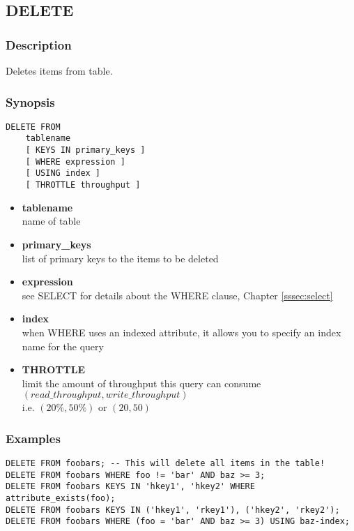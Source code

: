 \subsection{DELETE}
\subsubsection{Description}
Deletes items from table.

\subsubsection{Synopsis}
\lstset{language=Java}
\begin{lstlisting}
DELETE FROM
    tablename
    [ KEYS IN primary_keys ]
    [ WHERE expression ]
    [ USING index ]
    [ THROTTLE throughput ]	
\end{lstlisting}

\begin{itemize}
	\item \textbf{tablename} \\
	name of table
	\item \textbf{primary\_keys} \\
	list of primary keys to the items to be deleted
	\item \textbf{expression} \\
	see SELECT for details about the WHERE clause, Chapter \ref{sssec:select}
	\item \textbf{index} \\
	when WHERE uses an indexed attribute, it allows you to specify an index name for the query
	\item \textbf{THROTTLE} \\
	limit the amount of throughput this query can consume\\
	$(read\_throughput, write\_throughput)$\\
	i.e. $(20\%, 50\%)$ or $(20, 50)$ 
\end{itemize}
\vspace{40pt}

\subsubsection{Examples}
\lstset{language=Java}
\begin{lstlisting}
DELETE FROM foobars; -- This will delete all items in the table!
DELETE FROM foobars WHERE foo != 'bar' AND baz >= 3;
DELETE FROM foobars KEYS IN 'hkey1', 'hkey2' WHERE attribute_exists(foo);
DELETE FROM foobars KEYS IN ('hkey1', 'rkey1'), ('hkey2', 'rkey2');
DELETE FROM foobars WHERE (foo = 'bar' AND baz >= 3) USING baz-index;
	
\end{lstlisting}
\vspace{40pt}



